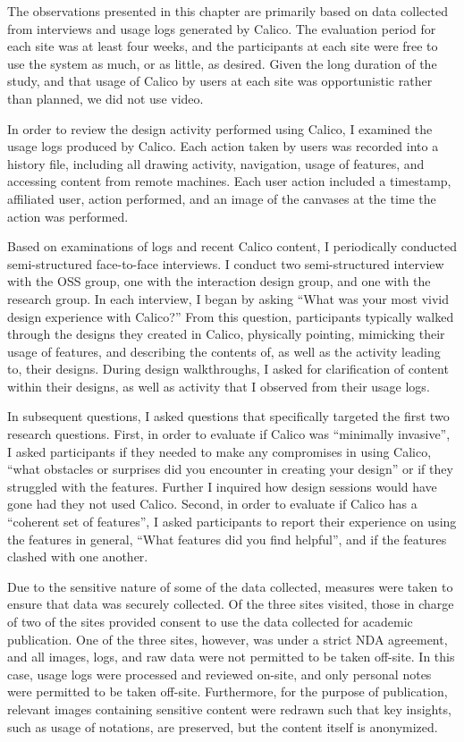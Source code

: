 The observations presented in this chapter are primarily based on data collected from interviews and usage logs generated by Calico. The evaluation period for each site was at least four weeks, and the participants at each site were free to use the system as much, or as little, as desired. Given the long duration of the study, and that usage of Calico by users at each site was opportunistic rather than planned, we did not use video.

In order to review the design activity performed using Calico, I examined the usage logs produced by Calico. Each action taken by users was recorded into a history file, including all drawing activity, navigation, usage of features, and accessing content from remote machines. Each user action included a timestamp, affiliated user, action performed, and an image of the canvases at the time the action was performed. 

Based on examinations of logs and recent Calico content, I periodically conducted semi-structured face-to-face interviews. I conduct two semi-structured interview with the OSS group, one with the interaction design group, and one with the research group. In each interview, I began by asking ``What was your most vivid design experience with Calico?'' From this question, participants typically walked through the designs they created in Calico, physically pointing, mimicking their usage of features, and describing the contents of, as well as the activity leading to, their designs. During design walkthroughs, I asked for clarification of content within their designs, as well as activity that I observed from their usage logs.

In subsequent questions, I asked questions that specifically targeted the first two research questions. First, in order to evaluate if Calico was ``minimally invasive'', I asked participants if they needed to make any compromises in using Calico, ``what obstacles or surprises did you encounter in creating your design'' or if they struggled with the features. Further I inquired how design sessions would have gone had they not used Calico. Second, in order to evaluate if Calico has a ``coherent set of features'', I asked participants to report their experience on using the features in general, ``What features did you find helpful'', and if the features clashed with one another. 

Due to the sensitive nature of some of the data collected, measures were taken to ensure that data was securely collected. Of the three sites visited, those in charge of two of the sites provided consent to use the data collected for academic publication. One of the three sites, however, was under a strict NDA agreement, and all images, logs, and raw data were not permitted to be taken off-site. In this case, usage logs were processed and reviewed on-site, and only personal notes were permitted to be taken off-site. Furthermore, for the purpose of publication, relevant images containing sensitive content were redrawn such that key insights, such as usage of notations, are preserved, but the content itself is anonymized.

